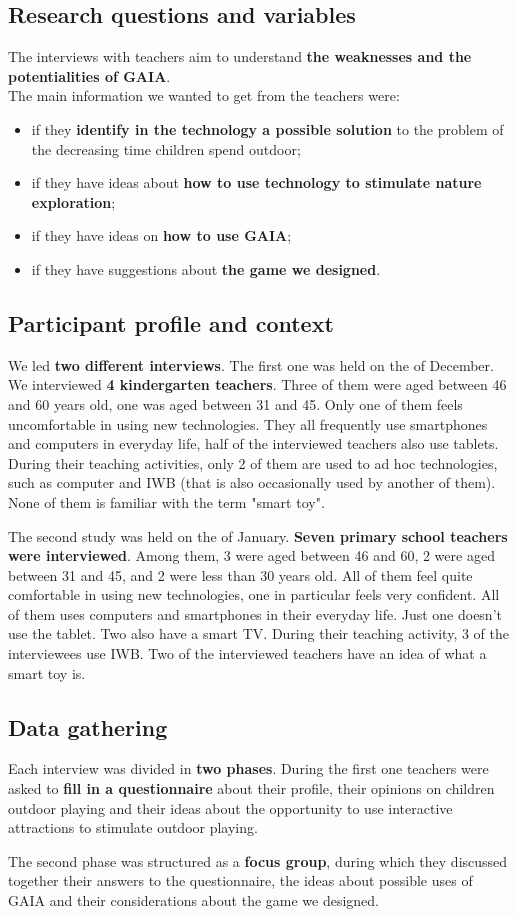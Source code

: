 \documentclass[a4paper,11pt]{report}
\begin{document}
\subsection{Research questions and variables}
The interviews with teachers aim to understand \textbf{the weaknesses and the potentialities of GAIA}.\\
The main information we wanted to get from the teachers were:
\begin{itemize}
	\item if they \textbf{identify in the technology a possible solution} to the problem of the decreasing time children spend outdoor;
	\item if they have ideas about \textbf{how to use technology to stimulate nature exploration};
	\item if they have ideas on \textbf{how to use GAIA};
	\item if they have suggestions about \textbf{the game we designed}.
\end {itemize}
\subsection{Participant profile and context}
We led \textbf{two different interviews}. The first one was held on the  of December. We interviewed \textbf{4 kindergarten teachers}. Three of them were aged between 46 and 60 years old, one was aged between 31 and 45. Only one of them feels uncomfortable in using new technologies. They all frequently use smartphones and computers in everyday life, half of the interviewed teachers also use tablets. During their teaching activities, only 2 of them are used to ad hoc technologies, such as computer and IWB (that is also occasionally used by another of them). None of them is familiar with the term "smart toy".\par
The second study was held on the  of January. \textbf{Seven primary school teachers were interviewed}. Among them, 3 were aged between 46 and 60, 2 were aged between 31 and 45, and 2 were less than 30 years old. All of them feel quite comfortable in using new technologies, one in particular feels very confident.  All of them uses computers and smartphones in their everyday life. Just one doesn't use the tablet. Two also have a smart TV. During their teaching activity, 3 of the interviewees use IWB. Two of the interviewed teachers have an idea of what a smart toy is.
\subsection{Data gathering} 
Each interview was divided in \textbf{two phases}. During the first one teachers were asked to \textbf{fill in a questionnaire} about their profile, their opinions on children outdoor playing and their ideas about the opportunity to use interactive attractions to stimulate outdoor playing.\par
The second phase was structured as a \textbf{focus group}, during which they discussed together their answers to the questionnaire, the ideas about possible uses of GAIA and their considerations about the game we designed.
\end{document}
